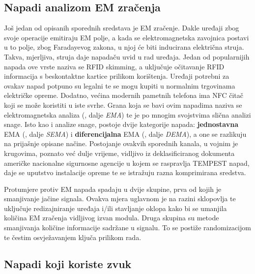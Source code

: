 \documentclass[times, utf8, diplomski]{fer}
\begin{document}
\subsection{Napadi analizom EM zračenja}
Još jedan od opisanih sporednih sredstava je EM zračenje. Dakle uređaji zbog svoje operacije emitiraju EM polje, a kada se elektromagnetska zavojnica postavi u to polje, zbog Faradayevog zakona, u njoj će biti inducirana električna struja. Takva, mjerljiva, struja daje napadaču uvid u rad uređaja. Jedan od popularnijih napada ove vrste naziva se RFID skimming, a uključuje očitavanje RFID informacija s beskontaktne kartice prilikom korištenja. Uređaji potrebni za ovakav napad potpuno su legalni te se mogu kupiti u normalnim trgovinama električke opreme. Dodatno, većina modernih pametnih telefona ima NFC čitač koji se može koristiti u iste svrhe. Grana koja se bavi ovim napadima naziva se elektromagnetska analiza (, dalje \emph{EMA}) te je po mnogim svojstvima slična analizi snage. Isto kao i analize snage, postoje dvije kategorije napada: \textbf{jednostavna} EMA (, dalje \emph{SEMA}) i \textbf{diferencijalna} EMA (, dalje \emph{DEMA}), a one se razlikuju na prijašnje opisane načine. Postojanje ovakvih sporednih kanala, u vojnim je krugovima, poznato već dulje vrijeme, vidljivo iz deklasificiranog dokumenta \citep{mcconnell1992national} američke nacionalne sigurnosne agencije  u kojem se raspravlja TEMPEST napad, daje se uputstvo instalacije opreme te se istražuju razna komprimirana sredstva.

Protumjere protiv EM napada spadaju u dvije skupine, prva od kojih je smanjivanje jačine signala. Ovakva mjera uglavnom je na razini sklopovlja te uključuje redizajniranje uređaja i/ili stavljanje oklopa kako bi se umanjila količina EM zračenja vidljivog izvan modula. Druga skupina su metode smanjivanja količine informacije sadržane u signalu. To se postiže randomizacijom te čestim osvježavanjem ključa prilikom rada.

\subsection{Napadi koji koriste zvuk}
\end{document}

